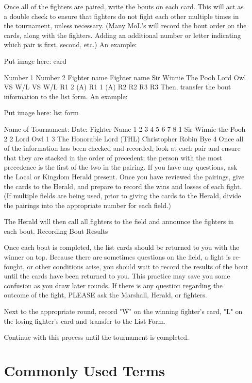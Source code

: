 \documentclass{article}
\begin{document}
Once all of the fighters are paired, write the bouts on each card. This will act as a double check to ensure
that fighters do not fight each other multiple times in the tournament, unless necessary. (Many MoL’s will
record the bout order on the cards, along with the fighters. Adding an additional number or letter
indicating which pair is first, second, etc.) An example:

Put image here: card

Number 1 Number 2
Fighter name Fighter name
Sir
Winnie The Pooh Lord Owl
VS W/L VS W/L
R1 2 (A) R1 1 (A)
R2 R2
R3 R3
Then, transfer the bout information to the list form. An example:

Put image here: list form

Name of Tournament: Date:
Fighter Name 1 2 3 4 5 6 7 8
1 Sir Winnie the Pooh 2
2 Lord Owl 1
3
The Honorable Lord (THL)
Christopher Robin Bye
4
Once all of the information has been checked and recorded, look at each pair and ensure that they are
stacked in the order of precedent; the person with the most precedence is the first of the two in the pairing.
If you have any questions, ask the Local or Kingdom Herald present. Once you have reviewed the
pairings, give the cards to the Herald, and prepare to record the wins and losses of each fight. (If multiple
fields are being used, prior to giving the cards to the Herald, divide the pairings into the appropriate
number for each field.)

The Herald will then call all fighters to the field and announce the fighters in each bout.
Recording Bout Results

Once each bout is completed, the list cards should be returned to you with the winner on top. Because
there are sometimes questions on the field, a fight is re-fought, or other conditions arise, you should wait
to record the results of the bout until the cards have been returned to you. This practice may save you
some confusion as you draw later rounds. If there is any question regarding the outcome of the fight,
PLEASE ask the Marshall, Herald, or fighters.

Next to the appropriate round, record "W" on the winning fighter’s card, "L" on the losing fighter’s card
and transfer to the List Form.

Continue with this process until the tournament is completed.

\section{Commonly Used Terms}
\end{document}
